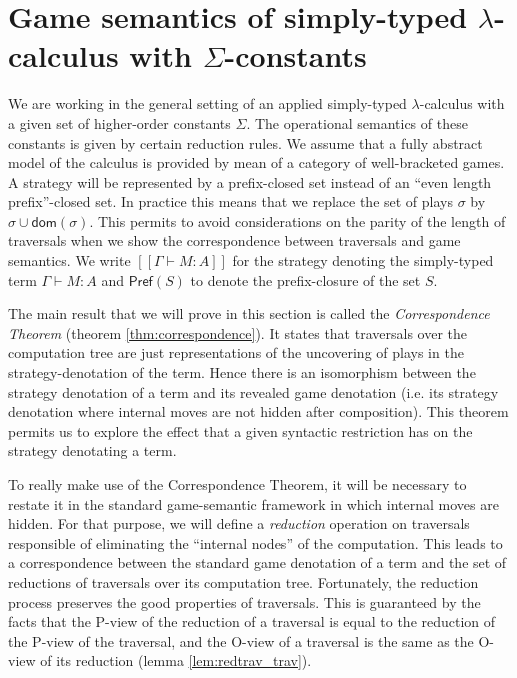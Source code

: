 \documentclass{llncs}
\newcommand{\lsem}{[\![} %
\newcommand{\rsem}{]\!]} %
\newcommand{\sem}[1]{{\lsem #1 \rsem}}
\newcommand\union{\cup}
\newcommand\prefset{\textsf{Pref}}
\begin{document}
\section{Game semantics of simply-typed $\lambda$-calculus with $\Sigma$-constants}
\label{sec:assumptions}


We are working in the general setting of an applied simply-typed $\lambda$-calculus with a given set of higher-order constants $\Sigma$.
The operational semantics of these constants is given by certain reduction rules.
We assume that a fully abstract model of the calculus is provided by mean of a category of well-bracketed games.
A strategy will be represented by a prefix-closed set instead of an ``even length
prefix''-closed set. In practice this means that we replace the set
of plays $\sigma$ by $\sigma \union \textsf{dom}(\sigma)$. This
permits to avoid considerations on the parity of the length of
traversals when we show the correspondence between traversals and
game semantics. We write $\sem{\Gamma \vdash M : A}$ for the strategy denoting the simply-typed term
$\Gamma \vdash M : A$ and $\prefset(S)$ to denote the
prefix-closure of the set $S$.


The main result that we will prove in this section is called the
\emph{Correspondence Theorem} (theorem \ref{thm:correspondence}). It
states that traversals over the computation tree are just
representations of the uncovering of plays in the
strategy-denotation of the term. Hence there is an isomorphism
between the strategy denotation of a term and its revealed game
denotation (i.e. its strategy denotation where internal moves are
not hidden after composition). This theorem permits us to explore
the effect that a given syntactic restriction has on the strategy
denotating a term.

To really make use of the Correspondence Theorem, it will be
necessary to restate it in the standard game-semantic framework in
which internal moves are hidden. For that purpose, we will define a
\emph{reduction} operation on traversals responsible of eliminating
the ``internal nodes'' of the computation. This leads to a
correspondence between the standard game denotation of a term and
the set of reductions of traversals over its computation tree.
Fortunately, the reduction process preserves the good properties of
traversals. This is guaranteed by the facts that the P-view of the
reduction of a traversal is equal to the reduction of the P-view of
the traversal, and the O-view of a traversal is the same as the
O-view of its reduction (lemma \ref{lem:redtrav_trav}). \vspace{8pt}
\end{document}
